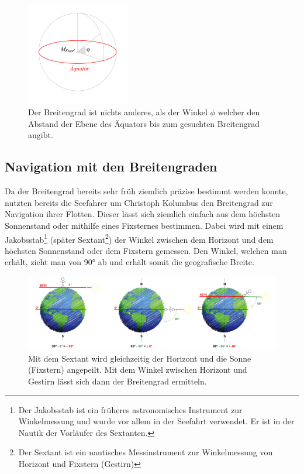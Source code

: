\begin{refsection}
\begin{figure}[hbtp]
\centering
\includegraphics[width=0.4\textwidth]{kugel/GeografischeBreite.jpg}
\caption{Der Breitengrad ist nichts anderes, als der Winkel $\phi$ welcher den Abstand der Ebene des Äquators bis zum gesuchten Breitengrad angibt.}
\end{figure}

\subsection{Navigation mit den Breitengraden}  \label{BreitengradM}
Da der Breitengrad bereits sehr früh ziemlich präzise bestimmt werden konnte, nutzten bereits die Seefahrer um Christoph Kolumbus den Breitengrad zur Navigation ihrer Flotten.
Dieser lässt sich ziemlich einfach aus dem höchsten Sonnenstand oder mithilfe eines Fixsternes bestimmen. Dabei wird mit einem Jakobsstab\footnote{%
Der Jakobsstab ist ein früheres astronomisches Instrument zur Winkelmessung und wurde vor allem in der Seefahrt verwendet. Er ist in der Nautik der Vorläufer des Sextanten.} (später Sextant\footnote{%
Der Sextant ist ein nautisches Messinstrument zur Winkelmessung von Horizont und Fixstern (Gestirn)}) der Winkel zwischen dem Horizont und dem höchsten Sonnenstand oder dem Fixstern gemessen. Den Winkel, welchen man erhält, zieht man von 90° ab und erhält somit die geografische Breite. 

\begin{figure}[htbp]
\centering
\includegraphics[width=1\textwidth]{kugel/Breitengrad.jpg}
\caption{Mit dem Sextant wird gleichzeitig der Horizont und die Sonne (Fixstern) angepeilt. Mit dem Winkel zwischen Horizont und Gestirn lässt sich dann der Breitengrad ermitteln.}
\end{figure}


\end{refsection}
